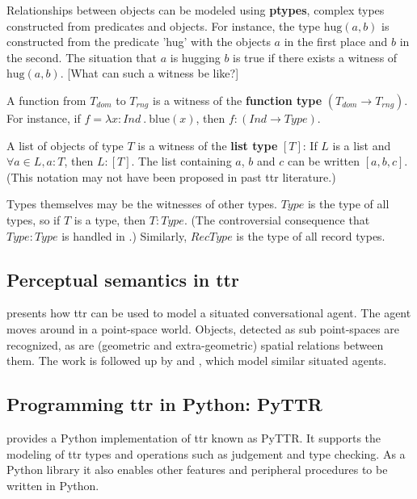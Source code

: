 Relationships between objects can be modeled using \textbf{ptypes}, complex types constructed from predicates and objects.
For instance, the type $\text{hug}(a,b)$ is constructed from the predicate 'hug' with the objects $a$ in the first place and $b$ in the second.
The situation that $a$ is hugging $b$ is true if there exists a witness of $\text{hug}(a,b)$.
[What can such a witness be like?]

A function from $T_{dom}$ to $T_{rng}$ is a witness of the \textbf{function type} $(T_{dom} \rightarrow T_{rng})$.
For instance, if $f = \lambda x : Ind\ .\ \text{blue}(x)$, then $f : (Ind \rightarrow Type)$.

A list of objects of type $T$ is a witness of the \textbf{list type} $[T]$:
If $L$ is a list and $\forall a \in L, a : T$, then $L : [T]$.
The list containing $a$, $b$ and $c$ can be written $[a, b, c]$.
(This notation may not have been proposed in past \gls{ttr} literature.)

Types themselves may be the witnesses of other types.
$Type$ is the type of all types, so if $T$ is a type, then $T : Type$.
(The controversial consequence that $Type : Type$ is handled in \citet[section 2.7]{CooperTypetheorysemantics2012}.)
Similarly, $RecType$ is the type of all record types.



\subsection{Perceptual semantics in \acrfull{ttr}}

\cite{DobnikModellinglanguageaction2012} presents how \gls{ttr} can be used to model a situated conversational agent.
The agent moves around in a point-space world.
Objects, detected as sub point-spaces are recognized, as are (geometric and extra-geometric) spatial relations between them.
The work is followed up by \cite{ttrspat} and \cite{lspc}, which model similar situated agents.




\subsection{Programming \acrshort{ttr} in Python: PyTTR}

\cite{pyttr} provides a Python implementation of \gls{ttr} known as PyTTR.
It supports the modeling of \gls{ttr} types and operations such as judgement and type checking.
As a Python library it also enables other features and peripheral procedures to be written in Python.

